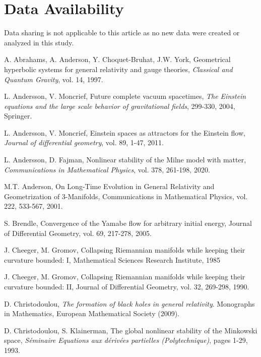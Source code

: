 \documentclass{amsart}
\begin{document}
\section{Data Availability}
\noindent Data sharing is not applicable to this article as no new data were created or analyzed in this study.

\begin{thebibliography}{}

 A. Abrahams, A. Anderson, Y. Choquet-Bruhat, J.W. York, Geometrical hyperbolic systems for general relativity and gauge theories, \textit{Classical and Quantum Gravity}, vol. 14, 1997.      

 L. Andersson, V. Moncrief, Future complete vacuum spacetimes, \textit{The Einstein equations and the large scale behavior of gravitational fields}, 299-330, 2004, Springer.

 L. Andersson, V. Moncrief, Einstein spaces as attractors for the Einstein flow, \textit{Journal of differential geometry}, vol. 89, 1-47, 2011.

 L. Andersson, D. Fajman, Nonlinear stability of the Milne model with matter, \textit{Communications in Mathematical Physics}, vol. 378, 261-198, 2020.   





 M.T. Anderson, On Long-Time Evolution in General Relativity and Geometrization of 3-Manifolds, Communications in Mathematical Physics, vol. 222, 533-567, 2001.   




 S. Brendle, Convergence of the Yamabe flow for arbitrary initial energy, Journal of Differential Geometry, vol. 69, 217-278, 2005.  



 J. Cheeger, M. Gromov, Collapsing Riemannian manifolds while keeping their curvature bounded: I, Mathematical Sciences Research Institute, 1985  


 J. Cheeger, M. Gromov, Collapsing Riemannian manifolds while keeping their curvature bounded: II, Journal of Differential Geometry, vol. 32, 269-298, 1990.

 D. Christodoulou, \textit{The formation of black holes in general relativity}. Monographs in Mathematics, European Mathematical Society (2009).


 D. Christodoulou, S. Klainerman, The global nonlinear stability of the Minkowski space, \textit{S\'eminaire Equations aux d\'eriv\'ees partielles (Polytechnique)}, pages 1-29, 1993.   


\end{thebibliography}
\end{document}
